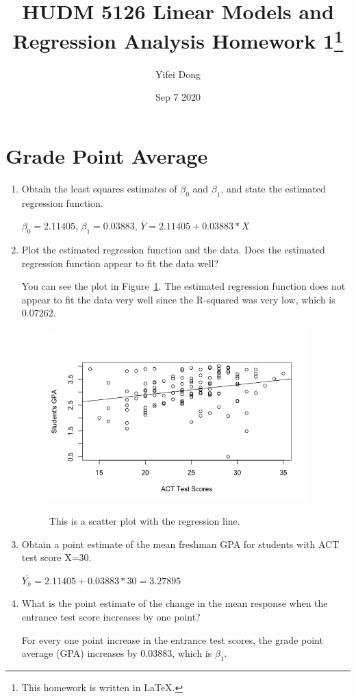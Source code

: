 \documentclass{article}
\title{HUDM 5126 Linear Models and Regression Analysis Homework 1\footnote{This homework is written in \LaTeX.}}
\author{Yifei Dong}
\date{Sep 7 2020}
\begin{document}
\maketitle
\section{Grade Point Average}
\begin{enumerate}[label=(\alph*)]
\item Obtain the least squares estimates of $\beta_{0}$ and $\beta_{1}$, and state the estimated regression function.

$\beta_{0}=2.11405$, $\beta_{1}=0.03883$, $\overline{Y}=2.11405+0.03883*X$

\item Plot the estimated regression function and the data. Does the estimated regression function appear to fit the data well?

You can see the plot in Figure~\ref{fig:plot1}. The estimated regression function does not appear to fit the data very well since the R-squared was very low, which is 0.07262.

\begin{figure}[htbp]
\begin{center}
\caption{This is a scatter plot with the regression line.}
\includegraphics[width=100mm]{scatterplot.png}
\label{fig:plot1}
\end{center}
\end{figure}

\item Obtain a point estimate of the mean freshman GPA for students with ACT test score X=30.

$\overline{Y_{h}}=2.11405+0.03883*30=3.27895$

\item What is the point estimate of the change in the mean response when the entrance test score increases by one point?

For every one point increase in the entrance test scores, the grade point average (GPA) increases by 0.03883, which is $\beta_{1}$.

\end{enumerate}
\end{document}
